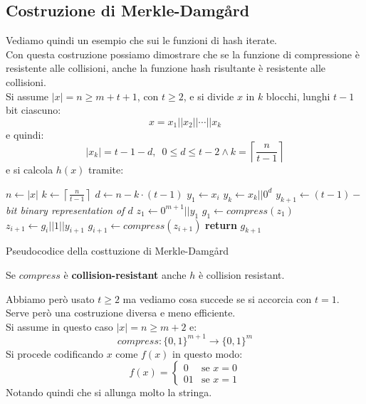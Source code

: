 \documentclass[a4paper,12pt, oneside]{book}
\begin{document}
\subsection{Costruzione di Merkle-Damg{\aa}rd}
Vediamo quindi un esempio che sui le funzioni di hash iterate. \\
Con questa costruzione possiamo dimostrare che se la funzione di compressione è
resistente alle collisioni, anche la funzione hash risultante è resistente alle
collisioni. \\
Si assume $|x|=n\geq m+t+1$, con $t\geq 2$, e si divide $x$ in $k$ blocchi,
lunghi $t-1$ bit ciascuno:
\[x=x_1||x_2||\cdots ||x_k\]
e quindi:
\[|x_k|=t-1-d,\,\,\,0\leq d\leq t-2\land
  k=\left\lceil\frac{n}{t-1}\right\rceil\]
e si calcola $h(x)$ tramite:
\begin{algorithm}[H]
  \small
  \begin{algorithmic}
    \State $n\gets |x|$
    \State $k\gets\left\lceil\frac{n}{t-1}\right\rceil$
    \State $d\gets n-k\cdot (t-1)$
    \State $y_1\gets x_i$
    \EndFor
    \State $y_k\gets x_k||0^d$
    \State $y_{k+1}\gets(t-1)-$\textit{bit binary representation of $d$}
    \State $z_1\gets 0^{m+1}||y_1$
    \State $g_1\gets compress(z_1)$
    \State $z_{i+1}\gets g_i||1||y_{i+1}$
    \State $g_{i+1}\gets compress(z_{i+1})$
    \EndFor
    \State \textbf{return} $g_{k+1}$
    \EndFunction
  \end{algorithmic}
  \caption{Pseudocodice della costtuzione di Merkle-Damg{\aa}rd}
\end{algorithm}
\begin{teorema}
  Se $compress$ è \textbf{collision-resistant} anche $h$ è collision resistant.
\end{teorema}
Abbiamo però usato $t\geq 2$ ma vediamo cosa succede se si accorcia con
$t=1$. Serve però una costruzione diversa e meno efficiente.\\
Si assume in questo caso $|x|=n\geq m+2$ e:
\[compress :\{0,1\}^{m+1}\to \{0,1\}^m\]
Si procede codificando $x$ come $f(x)$ in questo modo:
\[f(x)=
  \begin{cases}
    0&\mbox{se } x=0\\
    01&\mbox{se } x=1
  \end{cases}
\]
Notando quindi che si allunga molto la stringa.\\
\end{document}
